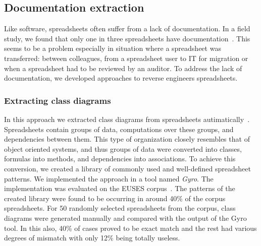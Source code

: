 \documentclass[conference]{IEEEtran}
\begin{document}
\subsection{Documentation extraction} 
Like software, spreadsheets often suffer from a lack of documentation. In a field study, we found that only one in three spreadsheets have documentation~\cite{Hermans2011}. This seems to be a problem especially in situation where a spreadsheet was transferred: between colleagues, from a spreadsheet user to IT for migration or when a spreadsheet had to be reviewed by an auditor. To address the lack of documentation, we developed approaches to reverse engineers spreadsheets.

\subsubsection{Extracting class diagrams}
In this approach we extracted class diagrams from spreadsheets autimatically~\cite{hermans_automatically_2010}. Spreadsheets contain groups of data, computations over these groups, and dependencies between them. This type of organization closely resembles that of object oriented systems, and thus groups of data were converted into classes, formulas into methods, and dependencies into associations. To achieve this conversion, we created a library of commonly used and well-defined spreadsheet patterns. We implemented the approach in a tool named \textit{Gyro}. The implementation was evaluated on the EUSES corpus~\cite{fisher_euses_2005}. The patterns of the created library were found to be occurring in around 40\% of the corpus spreadsheets. For 50 randomly selected spreadsheets from the corpus, class diagrams were generated manually and compared with the output of the Gyro tool. In this also, 40\% of cases proved to be exact match and the rest had various degrees of mismatch with only 12\% being totally useless.
\end{document}
